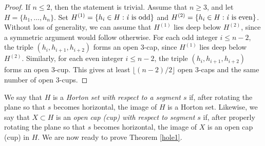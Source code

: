 \documentclass[11pt]{article}
\theoremstyle{plain}
\theoremstyle{definition}
\theoremstyle{remark}
\begin{document}
\begin{proof}
    If $n \leq 2$, then the statement is trivial.  Assume that $n\geq 3$, and let $H  = \{h_1,\ldots, h_n\}$.  Set $H^{(1)} = \{h_i \in H: \textnormal{\emph{i} is odd}\}$ and $H^{(2)} = \{h_i \in H: \textnormal{\emph{i} is even}\}$.  Without loss of generality, we can assume that $H^{(1)}$ lies deep below $H^{(2)}$, since a symmetric argument would follow otherwise. For each odd integer \(i\le n-2\), the triple
\((h_i,h_{i+1},h_{i+2})\)
forms an open 3-cap, since \(H^{(1)}\) lies deep below \(H^{(2)}\).
Similarly, for each even integer \(i\le n-2\), the triple \((h_i,h_{i+1},h_{i+2})\) forms an open 3-cup.
This gives at least
\(\lfloor (n-2)/2\rfloor\)
open 3-caps and the same number of open 3-cups.
\end{proof}

We say that $H$ is a \emph{Horton set with respect to a segment $s$} if, after rotating the plane so that $s$ becomes horizontal, the image of $H$ is a Horton set.  Likewise, we say that $X \subset H$ is an \emph{open cap (cup) with respect to segment $s$} if, after properly rotating the plane so that $s$ becomes horizontal, the image of $X$ is an open cap (cup) in $H$. We are now ready to prove Theorem \ref{hole1}.
\end{document}
